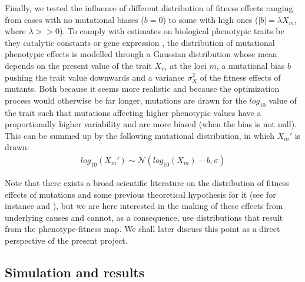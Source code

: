 \documentclass[11pt,onecolumn]{article}
\begin{document}
Finally, we tested the influence of different distribution of fitness effects ranging from cases with no mutational biases ($b=0$) to some with high ones ($|b|=\lambda X_m$, where $\lambda>>0$). To comply with estimates on biological phenotypic traits  be they catalytic constants \citep{Carlin16} or gene expression \citep{Metzger16,Hodgins-Davis19}, the distribution of mutational phenotypic effects is modelled through a Gaussian distribution whose mean depends on the present value of the trait $X_m$ at the loci $m$, a mutational bias $b$ pushing the trait value downwards and a variance $\sigma_X^2$ of the fitness effects of mutants. Both because it seems more realistic \citep{Carlin16} and because the optimization process would otherwise be far longer, mutations are drawn for the $log_{10}$ value of the trait such that mutations affecting higher phenotypic values have a proportionally higher variability and are more biased (when the bias is not null). This can be summed up by the following mutational distribution, in which $X_m'$ is drawn:
\begin{align}
log_{10}(X_m') \sim \mathcal{N}(log_{10}(X_m)-b,\sigma)
\end{align}

Note that there exists a broad scientific literature on the distribution of fitness effects of mutations \citep{Keightley07,Orr03,Gillespie84} and some previous theoretical hypothesis for it (see for instance \cite{Martin06} and \cite{Rice15}), but we are here interested in the making of these effects from underlying causes and cannot, as a consequence, use distributions that result from the phenotype-fitness map. We shall later discuss this point as a direct perspective of the present project.

\subsection{Simulation and results}
\end{document}
